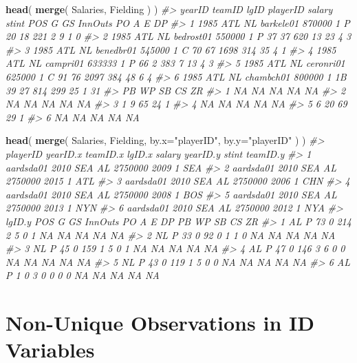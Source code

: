 \documentclass[]{book}
\newenvironment{Shaded}{\begin{snugshade}}{\end{snugshade}}
\newcommand{\CommentTok}[1]{\textcolor[rgb]{0.56,0.35,0.01}{\textit{#1}}}
\newcommand{\DataTypeTok}[1]{\textcolor[rgb]{0.13,0.29,0.53}{#1}}
\newcommand{\KeywordTok}[1]{\textcolor[rgb]{0.13,0.29,0.53}{\textbf{#1}}}
\newcommand{\NormalTok}[1]{#1}
\newcommand{\StringTok}[1]{\textcolor[rgb]{0.31,0.60,0.02}{#1}}
\theoremstyle{definition}
\theoremstyle{definition}
\theoremstyle{definition}
\theoremstyle{remark}
\begin{document}
\begin{Shaded}
\begin{Highlighting}[]

\KeywordTok{head}\NormalTok{( }\KeywordTok{merge}\NormalTok{( Salaries, Fielding ) )}
\CommentTok{#>   yearID teamID lgID  playerID salary stint POS  G GS InnOuts  PO  A E DP}
\CommentTok{#> 1   1985    ATL   NL barkele01 870000     1   P 20 18     221   2  9 1  0}
\CommentTok{#> 2   1985    ATL   NL bedrost01 550000     1   P 37 37     620  13 23 4  3}
\CommentTok{#> 3   1985    ATL   NL benedbr01 545000     1   C 70 67    1698 314 35 4  1}
\CommentTok{#> 4   1985    ATL   NL  campri01 633333     1   P 66  2     383   7 13 4  3}
\CommentTok{#> 5   1985    ATL   NL ceronri01 625000     1   C 91 76    2097 384 48 6  4}
\CommentTok{#> 6   1985    ATL   NL chambch01 800000     1  1B 39 27     814 299 25 1 31}
\CommentTok{#>   PB WP SB CS ZR}
\CommentTok{#> 1 NA NA NA NA NA}
\CommentTok{#> 2 NA NA NA NA NA}
\CommentTok{#> 3  1  9 65 24  1}
\CommentTok{#> 4 NA NA NA NA NA}
\CommentTok{#> 5  6 20 69 29  1}
\CommentTok{#> 6 NA NA NA NA NA}

\KeywordTok{head}\NormalTok{( }\KeywordTok{merge}\NormalTok{( Salaries, Fielding, }\DataTypeTok{by.x=}\StringTok{"playerID"}\NormalTok{, }\DataTypeTok{by.y=}\StringTok{"playerID"}\NormalTok{ ) )}
\CommentTok{#>    playerID yearID.x teamID.x lgID.x  salary yearID.y stint teamID.y}
\CommentTok{#> 1 aardsda01     2010      SEA     AL 2750000     2009     1      SEA}
\CommentTok{#> 2 aardsda01     2010      SEA     AL 2750000     2015     1      ATL}
\CommentTok{#> 3 aardsda01     2010      SEA     AL 2750000     2006     1      CHN}
\CommentTok{#> 4 aardsda01     2010      SEA     AL 2750000     2008     1      BOS}
\CommentTok{#> 5 aardsda01     2010      SEA     AL 2750000     2013     1      NYN}
\CommentTok{#> 6 aardsda01     2010      SEA     AL 2750000     2012     1      NYA}
\CommentTok{#>   lgID.y POS  G GS InnOuts PO A E DP PB WP SB CS ZR}
\CommentTok{#> 1     AL   P 73  0     214  2 5 0  1 NA NA NA NA NA}
\CommentTok{#> 2     NL   P 33  0      92  0 1 1  0 NA NA NA NA NA}
\CommentTok{#> 3     NL   P 45  0     159  1 5 0  1 NA NA NA NA NA}
\CommentTok{#> 4     AL   P 47  0     146  3 6 0  0 NA NA NA NA NA}
\CommentTok{#> 5     NL   P 43  0     119  1 5 0  0 NA NA NA NA NA}
\CommentTok{#> 6     AL   P  1  0       3  0 0 0  0 NA NA NA NA NA}
\end{Highlighting}
\end{Shaded}

\hypertarget{non-unique-observations-in-id-variables}{%
\section{Non-Unique Observations in ID
Variables}\label{non-unique-observations-in-id-variables}}
\end{document}
